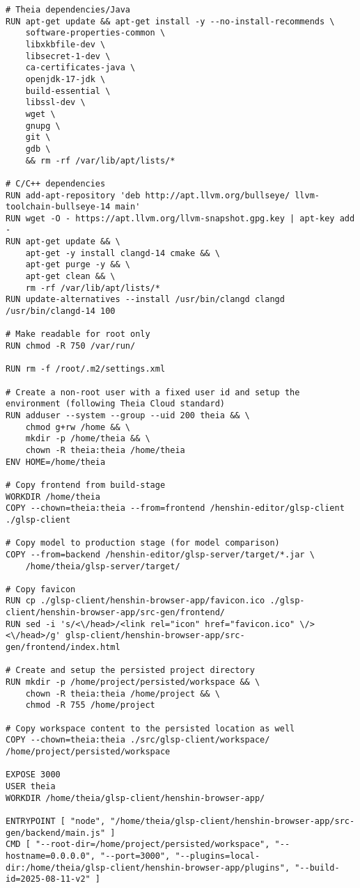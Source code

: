\begin{lstlisting}[language=Docker, caption={Dockerfile for Henshin Web Model Transformation Application}, label={lst:dockerfile}]
# Theia dependencies/Java
RUN apt-get update && apt-get install -y --no-install-recommends \
    software-properties-common \
    libxkbfile-dev \
    libsecret-1-dev \
    ca-certificates-java \
    openjdk-17-jdk \
    build-essential \
    libssl-dev \
    wget \
    gnupg \
    git \
    gdb \
    && rm -rf /var/lib/apt/lists/*

# C/C++ dependencies
RUN add-apt-repository 'deb http://apt.llvm.org/bullseye/ llvm-toolchain-bullseye-14 main'
RUN wget -O - https://apt.llvm.org/llvm-snapshot.gpg.key | apt-key add -
RUN apt-get update && \
    apt-get -y install clangd-14 cmake && \
    apt-get purge -y && \
    apt-get clean && \
    rm -rf /var/lib/apt/lists/*
RUN update-alternatives --install /usr/bin/clangd clangd /usr/bin/clangd-14 100

# Make readable for root only
RUN chmod -R 750 /var/run/

RUN rm -f /root/.m2/settings.xml

# Create a non-root user with a fixed user id and setup the environment (following Theia Cloud standard)
RUN adduser --system --group --uid 200 theia && \
    chmod g+rw /home && \
    mkdir -p /home/theia && \
    chown -R theia:theia /home/theia
ENV HOME=/home/theia

# Copy frontend from build-stage
WORKDIR /home/theia
COPY --chown=theia:theia --from=frontend /henshin-editor/glsp-client ./glsp-client

# Copy model to production stage (for model comparison)
COPY --from=backend /henshin-editor/glsp-server/target/*.jar \
    /home/theia/glsp-server/target/

# Copy favicon
RUN cp ./glsp-client/henshin-browser-app/favicon.ico ./glsp-client/henshin-browser-app/src-gen/frontend/
RUN sed -i 's/<\/head>/<link rel="icon" href="favicon.ico" \/><\/head>/g' glsp-client/henshin-browser-app/src-gen/frontend/index.html

# Create and setup the persisted project directory
RUN mkdir -p /home/project/persisted/workspace && \
    chown -R theia:theia /home/project && \
    chmod -R 755 /home/project

# Copy workspace content to the persisted location as well
COPY --chown=theia:theia ./src/glsp-client/workspace/ /home/project/persisted/workspace

EXPOSE 3000
USER theia
WORKDIR /home/theia/glsp-client/henshin-browser-app/

ENTRYPOINT [ "node", "/home/theia/glsp-client/henshin-browser-app/src-gen/backend/main.js" ]
CMD [ "--root-dir=/home/project/persisted/workspace", "--hostname=0.0.0.0", "--port=3000", "--plugins=local-dir:/home/theia/glsp-client/henshin-browser-app/plugins", "--build-id=2025-08-11-v2" ]
\end{lstlisting}
